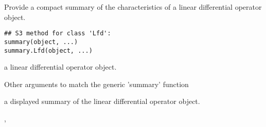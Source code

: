 \begin{Description}\relax
Provide a compact summary of the characteristics of a
linear differential operator object.
\end{Description}
\begin{Usage}
\begin{verbatim}
## S3 method for class 'Lfd':
summary(object, ...)
summary.Lfd(object, ...)
\end{verbatim}
\end{Usage}
\begin{Arguments}
\begin{ldescription}
\item[\code{object}] a linear differential operator object.

\item[\code{...}] Other arguments to match the generic 'summary' function
\end{ldescription}
\end{Arguments}
\begin{Value}
a displayed summary of the linear differential operator object.
\end{Value}
\begin{SeeAlso}\relax
{},
\end{SeeAlso}

